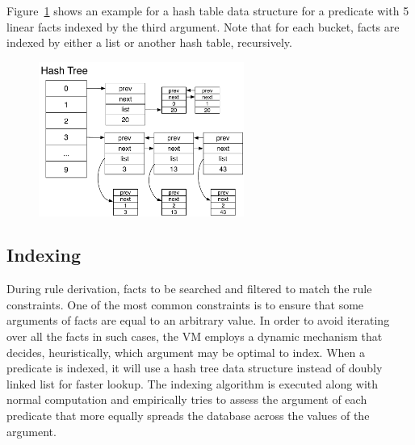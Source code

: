 Figure~\ref{fig:implementation:hash_table} shows an example for a hash table
data structure for a  predicate with 5 linear facts
indexed by the third argument. Note that for each bucket, facts are indexed by
either a list or another hash table, recursively.

\begin{figure}[ht]
   \centering
   \includegraphics[width=0.6\textwidth]{figures/implementation/hash_table.pdf}


   \label{fig:implementation:hash_table}
\end{figure}


\subsection{Indexing}\label{sec:implementation:indexing}

During rule derivation, facts to be searched and filtered to match the rule
constraints. One of the most common constraints is to ensure that some arguments
of facts are equal to an arbitrary value. In order to avoid iterating over all
the facts in such cases, the VM employs a dynamic mechanism that decides,
heuristically, which argument may be optimal to index. When a predicate is
indexed, it will use a hash tree data structure instead of doubly linked list for
faster lookup. The indexing algorithm is executed along with normal computation
and empirically tries to assess the argument of each predicate that more equally
spreads the database across the values of the argument. 

